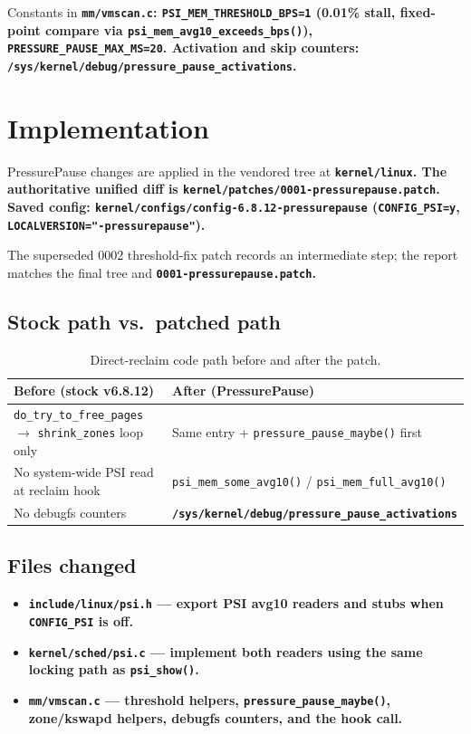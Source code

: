 \documentclass[12pt,a4paper]{article}
\newcommand{\srcfile}[1]{\begingroup\bfseries\color{aublue}\nolinkurl{#1}\endgroup}
\begin{document}
Constants in \srcfile{mm/vmscan.c}: \texttt{PSI\_MEM\_THRESHOLD\_BPS=1} (0.01\% stall, fixed-point compare via \texttt{psi\_mem\_avg10\_exceeds\_bps()}), \texttt{PRESSURE\_PAUSE\_MAX\_MS=20}. Activation and skip counters: \texttt{/sys/kernel/debug/pressure\_pause\_activations}.

\section{Implementation}

PressurePause changes are applied in the vendored tree at \srcfile{kernel/linux}. The authoritative unified diff is \srcfile{kernel/patches/0001-pressurepause.patch}. Saved config: \srcfile{kernel/configs/config-6.8.12-pressurepause} (\texttt{CONFIG\_PSI=y}, \texttt{LOCALVERSION="-pressurepause"}).

The superseded 0002 threshold-fix patch records an intermediate step; the report matches the final tree and \srcfile{0001-pressurepause.patch}.

\subsection{Stock path vs.\ patched path}

\begin{table}[H]
\centering
\begin{tabular}{@{}p{5.5cm}p{5.5cm}@{}}
\toprule
\textbf{Before (stock v6.8.12)} & \textbf{After (PressurePause)} \\
\midrule
\texttt{do\_try\_to\_free\_pages} $\rightarrow$ \texttt{shrink\_zones} loop only & Same entry + \texttt{pressure\_pause\_maybe()} first \\
No system-wide PSI read at reclaim hook & \texttt{psi\_mem\_some\_avg10()} / \texttt{psi\_mem\_full\_avg10()} \\
No debugfs counters & \srcfile{/sys/kernel/debug/pressure_pause_activations} \\
\bottomrule
\end{tabular}
\caption{Direct-reclaim code path before and after the patch.}
\end{table}

\subsection{Files changed}

\begin{itemize}[leftmargin=1.2cm]
    \item \srcfile{include/linux/psi.h} --- export PSI avg10 readers and stubs when \texttt{CONFIG\_PSI} is off.
    \item \srcfile{kernel/sched/psi.c} --- implement both readers using the same locking path as \texttt{psi\_show()}.
    \item \srcfile{mm/vmscan.c} --- threshold helpers, \texttt{pressure\_pause\_maybe()}, zone/kswapd helpers, debugfs counters, and the hook call.
\end{itemize}
\end{document}
